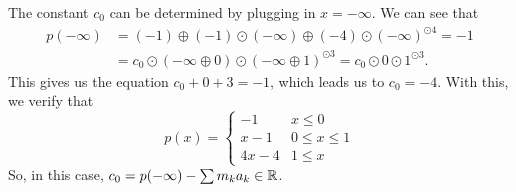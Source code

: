 \documentclass[12pt]{memoir}
\theoremstyle{definition}
\begin{document}
\begin{Ex}
    The constant $c_0$ can be determined by plugging in $x=-\infty$. We can see that 
    \begin{align*}
        p(-\infty)&=(-1)\oplus(-1)\odot (-\infty)\oplus(-4)\odot (-\infty)^{\odot4}=-1\\
        &=c_0\odot(-\infty\oplus 0)\odot(-\infty\oplus 1)^{\odot3}=c_0\odot0\odot 1^{\odot 3}.
    \end{align*}
    This gives us the equation $c_0+0+3=-1$, which leads us to $c_0=-4$. With this, we verify that 
    $$p(x)=\begin{cases}
        -1&x\leq 0\\
        x-1&0\leq x\leq 1\\
        4x-4&1\leq x
    \end{cases}$$
    So, in this case, $c_0=p(-\infty)-\sum m_ka_k\in\mathbb{R}$.
\end{Ex}
\end{document}
